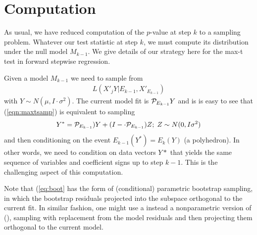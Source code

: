 \documentclass{article}
\begin{document}
\section{Computation}\label{sec:computation}

As usual, we have reduced computation of the $p$-value at step $k$ to a sampling problem. Whatever our test statistic at step $k$, we must compute its distribution under the null model $M_{k-1}$. We give details of our  strategy here for the max-t test in forward stepwise regression.


Given a model $M_{k-1}$   we need to sample from 
\begin{eqnarray}
L(X'_jY | E_{k-1},X'_{E_{k-1}})
\label{eqn:maxtsamp}
\end{eqnarray}
with $Y\sim N(\mu, I \cdot \sigma^2)$.
The current model fit is $\mathcal{P}_{E_{k-1}} Y$ and is is easy to see that (\ref{eqn:maxtsamp})  is equivalent to sampling
\begin{eqnarray}
Y^*=\mathcal{P}_{E_{k-1}}) Y + (I- \cdot \mathcal{P}_{E_{k-1}}) Z; \;Z\sim N(0,I\sigma^2)
\label{eq:boot}
\end{eqnarray}
and then conditioning on the event $E_{k-1}(Y^*)= E_k(Y)$ (a polyhedron).
In other words, we need to condition on data vectors  $Y*$ that yields the same
sequence of variables and coefficient signs up to step $k-1$. This is the challenging aspect of this computation.

Note that  (\ref{eq:boot}  has the form of  (conditional) parametric bootstrap sampling, in which the bootstrap residuals projected into the subspace
orthogonal to the current fit. In similar fashion, one might use a instead a nonparametric version of (), sampling
with replacement from the model residuals and then projecting them orthogonal to the current model.
\end{document}
